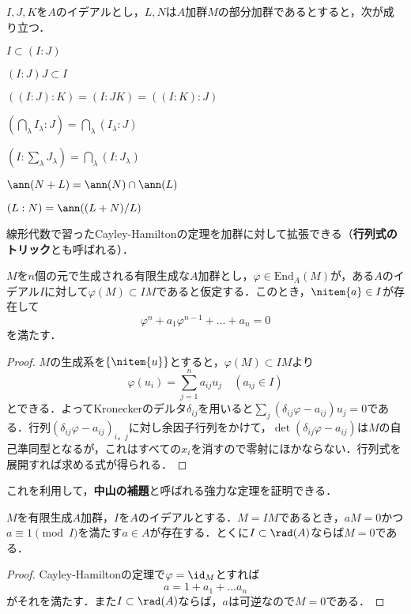 \begin{prop}\label{prop:加群商}
	$I,J,K$を$A$のイデアルとし，$L,N$は$A$加群$M$の部分加群であるとすると，次が成り立つ．
	\begin{sakura}
		\item $I\subset(I:J)$
		\item $(I:J)J\subset I$
		\item $((I:J):K)=(I:JK)=((I:K):J)$
		\item $(\bigcap_\lambda I_\lambda:J)=\bigcap_\lambda (I_\lambda:J)$
		\item $(I:\sum_\lambda J_\lambda)=\bigcap_\lambda (I:J_\lambda)$
		\item $\ann (N+L)=\ann (N)\cap\ann (L)$
		\item $(L:N)=\ann((L+N)/L)$
	\end{sakura}
\end{prop}

線形代数で習ったCayley-Hamiltonの定理を加群に対して拡張できる（\textbf{行列式のトリック}とも呼ばれる）．
\begin{thm}
	\label{thm:Cayley-Hamilton}
	$M$を$n$個の元で生成される有限生成な$A$加群とし，$\varphi\in\text{End}_A(M)$が，ある$A$のイデアル$I$に対して$\varphi(M)\subset IM$であると仮定する．このとき，$\nitem{a}\in I$が存在して
	\[\varphi^n+a_1\varphi^{n-1}+\dots+a_n=0\]
	を満たす．
\end{thm}
\begin{proof}
	$M$の生成系を$\{\nitem{u}\}$とすると，$\varphi(M)\subset IM$より
	\[\varphi(u_i)=\sum_{j=1}^n a_{ij}u_j\quad(a_{ij}\in I)\]
	とできる．よってKroneckerのデルタ$\delta_{ij}$を用いると$\sum_j(\delta_{ij}\varphi-a_{ij})u_j=0$である．行列$(\delta_{ij}\varphi-a_{ij})_{i，j}$に対し余因子行列をかけて，$\det(\delta_{ij}\varphi-a_{ij})$は$M$の自己準同型となるが，これはすべての$x_i$を消すので零射にほかならない．行列式を展開すれば求める式が得られる．
\end{proof}

これを利用して，\textbf{中山の補題}と呼ばれる強力な定理を証明できる．	

\begin{thm}[中山の補題]\label{thm:NAK}
	$M$を有限生成$A$加群，$I$を$A$のイデアルとする．$M=IM$であるとき，$aM=0$かつ$a\equiv1\pmod{I}$を満たす$a\in A$が存在する．とくに$I\subset\rad(A)$ならば$M=0$である．
\end{thm}

\begin{proof}
	Cayley-Hamiltonの定理で$\varphi=\id_{M}$とすれば
	\[a=1+a_1+\dots a_n\]
	がそれを満たす．また$I\subset\rad(A)$ならば，$a$は可逆なので$M=0$である．
\end{proof}

